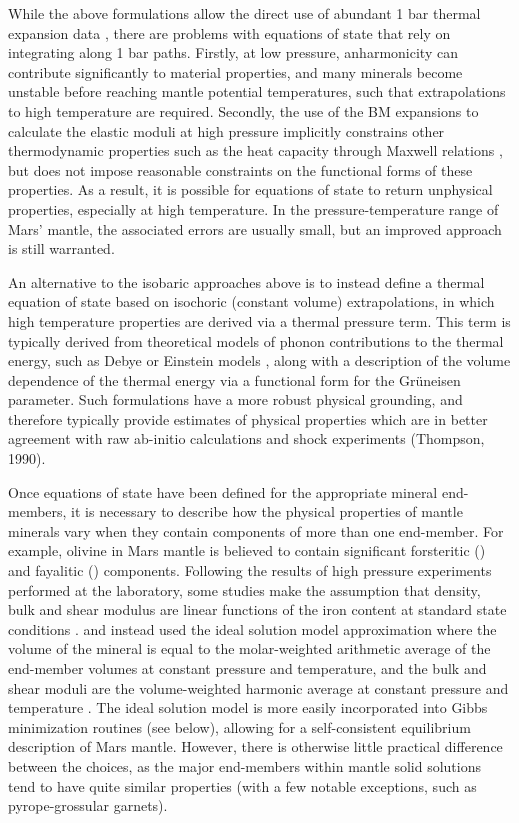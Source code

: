 While the above formulations allow the direct use of abundant 1 bar thermal expansion data \citep[e.g.][]{Saxena1992}, there are problems with equations of state that rely on integrating along 1 bar paths. Firstly, at low pressure, anharmonicity can contribute significantly to material properties, and many minerals become unstable before reaching mantle potential temperatures, such that extrapolations to high temperature are required. Secondly, the use of the BM expansions to calculate the elastic moduli at high pressure implicitly constrains other thermodynamic properties such as the heat capacity through Maxwell relations \citep[e.g.][]{Fegley2013}, but does not impose reasonable constraints on the functional forms of these properties. As a result, it is possible for equations of state to return unphysical properties, especially at high temperature. In the pressure-temperature range of Mars' mantle, the associated errors are usually small, but an improved approach is still warranted.

An alternative to the isobaric approaches above is to instead define a thermal equation of state based on isochoric (constant volume) extrapolations, in which high temperature properties are derived via a thermal pressure term. This term is typically derived from theoretical models of phonon contributions to the thermal energy, such as Debye or Einstein models \citep{Stixrude2005,Matas2007,Holland2011}, along with a description of the volume dependence of the thermal energy via a functional form for the Gr\"uneisen parameter. Such formulations have a more robust physical grounding, and therefore typically provide estimates of physical properties which are in better agreement with raw ab-initio calculations and shock experiments (Thompson, 1990). 

Once equations of state have been defined for the appropriate mineral end-members, it is necessary to describe how the physical properties of mantle minerals vary when they contain components of more than one end-member. For example, olivine in Mars mantle is believed to contain significant forsteritic () and fayalitic () components. Following the results of high pressure experiments performed at the laboratory, some studies make the assumption that density, bulk and shear modulus are linear functions of the iron content at standard state conditions \citep{Mocquet1996,Verhoeven2005,Rivoldini2011}. \cite{Khan2008} and \cite{Khan2018} instead used the ideal solution model approximation where the volume of the mineral is equal to the molar-weighted arithmetic average of the end-member volumes at constant pressure and temperature, and the bulk and shear moduli are the volume-weighted harmonic average at constant pressure and temperature \citep{Stixrude2005}. The ideal solution model is more easily incorporated into Gibbs minimization routines (see below), allowing for a self-consistent equilibrium description of Mars mantle. However, there is otherwise little practical difference between the choices, as the major end-members within mantle solid solutions tend to have quite similar properties (with a few notable exceptions, such as pyrope-grossular garnets).

